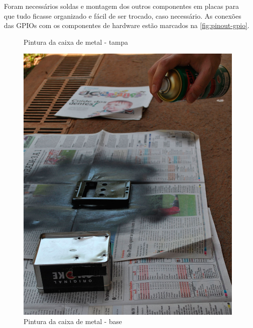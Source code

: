 Foram necessários soldas e montagem dos outros componentes em placas para que tudo ficasse organizado e fácil de ser trocado, caso necessário. As conexões das GPIOs com os componentes de hardware estão marcados na \autoref{fig:pinout-gpio}.

\begin{figure}[htb]
	\centering
 	\begin{minipage}{0.45\textwidth}
		\centering
		\caption{\label{fig:pintar-1}Pintura da caixa de metal - tampa}
		\includegraphics[width=1\textwidth]{img/pintar-1.jpg}
	\end{minipage}
	\hfill
	\begin{minipage}{0.45\textwidth}
		\centering
		\caption{\label{fig:pintar-2}Pintura da caixa de metal - base}

\end{minipage}
\end{figure}
